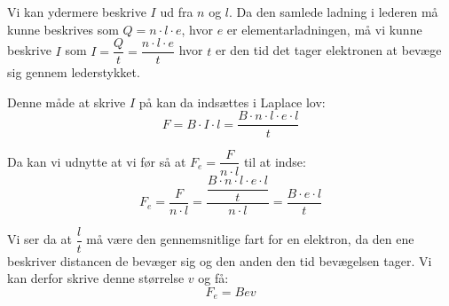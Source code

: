 \documentclass[10pt,a4paper]{article}
\theoremstyle{break}
\theoremstyle{nonumberplain}
\begin{document}
Vi kan ydermere beskrive $I$ ud fra $n$ og $l$. 
Da den samlede ladning i lederen må kunne beskrives som $Q=n\cdot l \cdot e$, hvor $e$ er elementarladningen, må vi kunne beskrive $I$ som $I=\dfrac{Q}{t}=\dfrac{n\cdot l \cdot e}{t}$ hvor $t$ er den tid det tager elektronen at bevæge sig gennem lederstykket.

Denne måde at skrive $I$ på kan da indsættes i Laplace lov:
$$F = B\cdot I \cdot l = \dfrac{B\cdot n\cdot l\cdot e \cdot l}{t}$$

Da kan vi udnytte at vi før så at $F_e = \dfrac{F}{n\cdot l}$ til at indse:
$$F_e = \dfrac{F}{n\cdot l} = \dfrac{\dfrac{B\cdot n\cdot l\cdot e \cdot l}{t}}{n\cdot l} = \dfrac{B\cdot e\cdot l}{t}$$

Vi ser da at $\dfrac{l}{t}$ må være den gennemsnitlige fart for en elektron, da den ene beskriver distancen de bevæger sig og den anden den tid bevægelsen tager. 
Vi kan derfor skrive denne størrelse $v$ og få:
$$F_e = Bev$$





 
\end{document}
